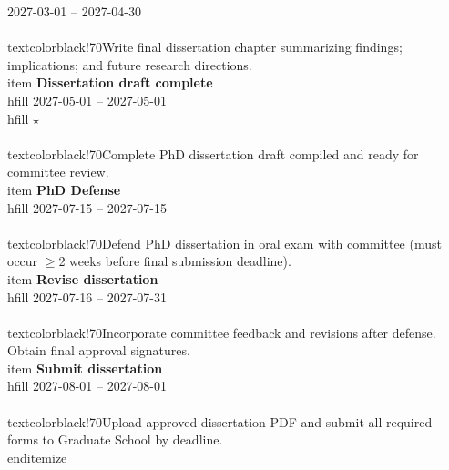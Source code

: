\documentclass[a4paper]{article}
\begin{document}
\begin{enumerate}[leftmargin=0.3cm, itemsep=0.3em, parsep=0.1em, topsep=0.1em]
\textcolor{black!50}{\tiny 2027-03-01 -- 2027-04-30} \\ \\textcolor{black!70}{\tiny Write final dissertation chapter summarizing findings; implications; and future research directions.} \\item \textcolor{milestone!70}{\textbf{\small Dissertation draft complete}} \\hfill \textcolor{black!50}{\tiny 2027-05-01 -- 2027-05-01} \\hfill \textcolor{milestone}{\textbf{\tiny$\star$}} \\ \\textcolor{black!70}{\tiny Complete PhD dissertation draft compiled and ready for committee review.} \\item \textcolor{milestone!70}{\textbf{\small PhD Defense}} \\hfill \textcolor{black!50}{\tiny 2027-07-15 -- 2027-07-15} \\ \\textcolor{black!70}{\tiny Defend PhD dissertation in oral exam with committee (must occur $\geq$2 weeks before final submission deadline).} \\item \textcolor{milestone!70}{\textbf{\small Revise dissertation}} \\hfill \textcolor{black!50}{\tiny 2027-07-16 -- 2027-07-31} \\ \\textcolor{black!70}{\tiny Incorporate committee feedback and revisions after defense. Obtain final approval signatures.} \\item \textcolor{milestone!70}{\textbf{\small Submit dissertation}} \\hfill \textcolor{black!50}{\tiny 2027-08-01 -- 2027-08-01} \\ \\textcolor{black!70}{\tiny Upload approved dissertation PDF and submit all required forms to Graduate School by deadline.} \\end{{itemize}}
\end{enumerate}
\end{document}
